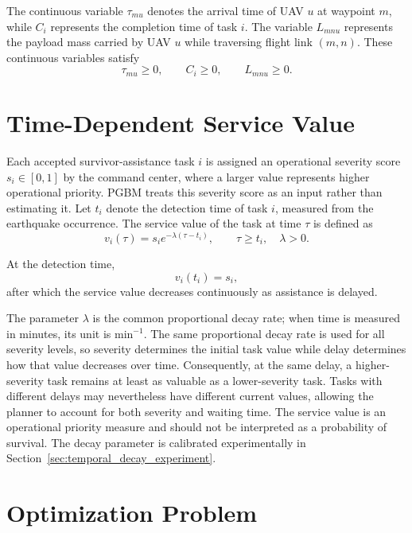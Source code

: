 The continuous variable $\tau_{mu}$ denotes the arrival time of UAV $u$ at
waypoint $m$, while $C_i$ represents the completion time of task $i$. The
variable $L_{mnu}$ represents the payload mass carried by UAV $u$ while
traversing flight link $(m,n)$. These continuous variables satisfy
\begin{equation}
\tau_{mu}\geq 0,\qquad C_i\geq 0,\qquad L_{mnu}\geq 0.
\end{equation}

\section{Time-Dependent Service Value}
\label{sec:service_value}

Each accepted survivor-assistance task $i$ is assigned an operational severity
score $s_i\in[0,1]$ by the command center, where a larger value represents
higher operational priority. PGBM treats this severity score as an input rather
than estimating it. Let $t_i$ denote the detection time of task $i$, measured
from the earthquake occurrence. The service value of the task at time $\tau$ is
defined as
\begin{equation}
v_i(\tau)
=
s_i e^{-\lambda(\tau-t_i)},
\qquad
\tau\geq t_i,\quad \lambda>0.
\end{equation}

At the detection time,
\begin{equation}
v_i(t_i)=s_i,
\end{equation}
after which the service value decreases continuously as assistance is delayed.

The parameter $\lambda$ is the common proportional decay rate; when time is
measured in minutes, its unit is $\mathrm{min}^{-1}$. The same proportional
decay rate is used for all severity levels, so severity determines the initial
task value while delay determines how that value decreases over time.
Consequently, at the same delay, a higher-severity task remains at least as
valuable as a lower-severity task. Tasks with different delays may nevertheless
have different current values, allowing the planner to account for both
severity and waiting time. The service value is an operational priority measure
and should not be interpreted as a probability of survival. The decay parameter
is calibrated experimentally in Section~\ref{sec:temporal_decay_experiment}.

\section{Optimization Problem}

